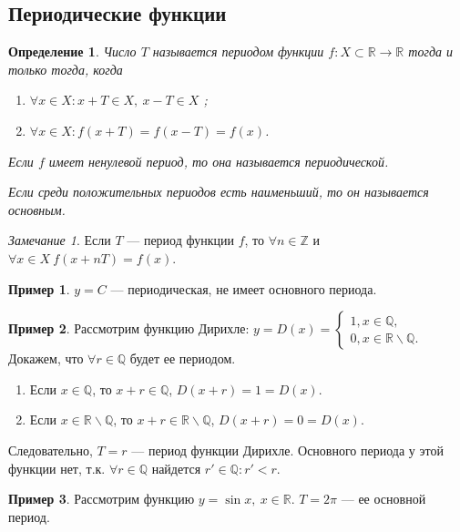 \documentclass[a4paper,12pt]{article} %
\newtheorem{definition}{Определение}[section]
\theoremstyle{remark}
\newtheorem*{remark}{Замечание}
\theoremstyle{definition}
\newtheorem{exmp}{Пример}[section]
\begin{document}
\subsection{Периодические функции}
\begin{definition}
    Число $T$ называется периодом функции $f : X\subset \mathbb{R} \to \mathbb{R}$ тогда и только тогда, когда
    \begin{enumerate}
        \item $\forall x \in X : x + T \in X, \ x - T \in X$ ;
        \item $\forall x \in X : f(x+T) = f(x-T) = f(x)$.
    \end{enumerate}

    Если $f$ имеет ненулевой период, то она называется периодической.

    Если среди положительных периодов есть наименьший, то он называется основным.
\end{definition}
\begin{remark}
    Если $T$ --- период функции $f$, то $\forall n\in \mathbb{Z}$ и $\forall x \in X \ f(x+nT) = f(x)$.
\end{remark}
\begin{exmp}
    $y = C$ --- периодическая, не имеет основного периода.
\end{exmp}
\begin{exmp}
    Рассмотрим функцию Дирихле: $y = D(x) = \begin{cases}
        1, x\in \mathbb{Q}, \\
        0, x \in \mathbb{R} \backslash \mathbb{Q}.
    \end{cases}$
    Докажем, что $\forall r \in \mathbb{Q}$ будет ее периодом.
    \begin{enumerate}
        \item Если $x\in \mathbb{Q}$, то $x + r \in \mathbb{Q}$, $D(x + r) = 1 = D(x)$.
        \item Если $x \in \mathbb{R}\backslash \mathbb{Q}$, то $x + r \in \mathbb{R}\backslash \mathbb{Q}$, 
            $D(x+r) = 0 = D(x)$.
    \end{enumerate}
    Следовательно, $T = r$ --- период функции Дирихле. Основного периода у этой функции нет,
    т.к. $\forall r\in \mathbb{Q}$ найдется $r'\in \mathbb{Q} : r' < r$.
\end{exmp}
\begin{exmp}
    Рассмотрим функцию $y = \sin x, \ x \in \mathbb{R}$. $T= 2\pi$ --- ее основной период.
\end{exmp}
\end{document}
